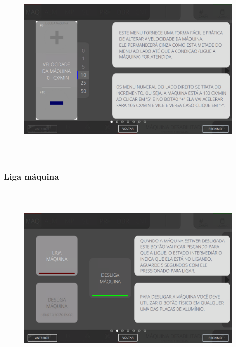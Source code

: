 \begin{figure}[h]
  \centering
  \includegraphics[width=576px,height=360px]{src/imagesFlexo/02-machine/e-1.png}
\end{figure}

\vspace*{\fill}

\newpage
\thispagestyle{fancy}

\vspace*{\fill}

\subsubsection{\small{Liga máquina}}

\begin{figure}[h]
  \centering
  \includegraphics[width=576px,height=360px]{src/imagesFlexo/02-machine/e-2.png}
\end{figure}

